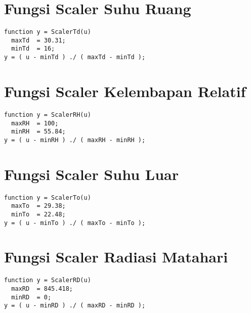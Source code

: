 \section{Fungsi Scaler Suhu Ruang}
\begin{lstlisting}
function y = ScalerTd(u)
  maxTd  = 30.31;
  minTd  = 16;
y = ( u - minTd ) ./ ( maxTd - minTd );
\end{lstlisting}
\hfill

\section{Fungsi Scaler Kelembapan Relatif}
\begin{lstlisting}
function y = ScalerRH(u)
  maxRH  = 100;
  minRH  = 55.84;
y = ( u - minRH ) ./ ( maxRH - minRH );
\end{lstlisting}
\hfill

\section{Fungsi Scaler Suhu Luar}
\begin{lstlisting}
function y = ScalerTo(u)
  maxTo  = 29.38;
  minTo  = 22.48;
y = ( u - minTo ) ./ ( maxTo - minTo );
\end{lstlisting}
\hfill

\section{Fungsi Scaler Radiasi Matahari}
\begin{lstlisting}
function y = ScalerRD(u)
  maxRD  = 845.418;
  minRD  = 0;
y = ( u - minRD ) ./ ( maxRD - minRD );
\end{lstlisting}
\hfill
